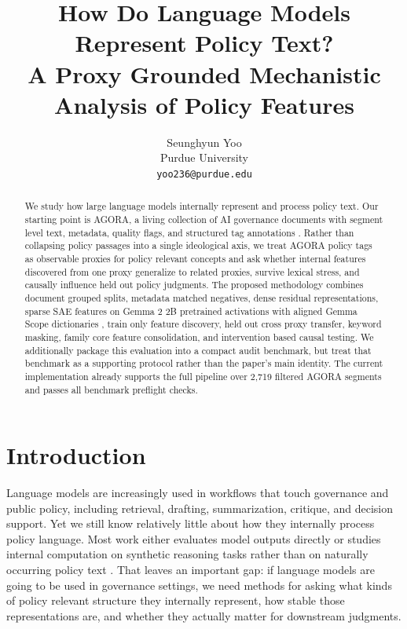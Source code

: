 ﻿\documentclass{article}
\title{How Do Language Models Represent Policy Text?\\
A Proxy Grounded Mechanistic Analysis of Policy Features}
\author{
  Seunghyun Yoo \\
  Purdue University \\
  \texttt{yoo236@purdue.edu}
}
\begin{document}
\maketitle

\begin{abstract}
We study how large language models internally represent and process policy text. Our starting point is AGORA, a living collection of AI governance documents with segment level text, metadata, quality flags, and structured tag annotations \citep{agora2024}. Rather than collapsing policy passages into a single ideological axis, we treat AGORA policy tags as observable proxies for policy relevant concepts and ask whether internal features discovered from one proxy generalize to related proxies, survive lexical stress, and causally influence held out policy judgments. The proposed methodology combines document grouped splits, metadata matched negatives, dense residual representations, sparse SAE features on Gemma 2 2B pretrained activations with aligned Gemma Scope dictionaries \citep{gemma2_2024, lieberum2024gemma}, train only feature discovery, held out cross proxy transfer, keyword masking, family core feature consolidation, and intervention based causal testing. We additionally package this evaluation into a compact audit benchmark, but treat that benchmark as a supporting protocol rather than the paper's main identity. The current implementation already supports the full pipeline over 2,719 filtered AGORA segments and passes all benchmark preflight checks.
\end{abstract}

\section{Introduction}
Language models are increasingly used in workflows that touch governance and public policy, including retrieval, drafting, summarization, critique, and decision support. Yet we still know relatively little about how they internally process policy language. Most work either evaluates model outputs directly or studies internal computation on synthetic reasoning tasks rather than on naturally occurring policy text \citep{elhage2021framework, conmy2023towards, ameisen2025circuit}. That leaves an important gap: if language models are going to be used in governance settings, we need methods for asking what kinds of policy relevant structure they internally represent, how stable those representations are, and whether they actually matter for downstream judgments.
\end{document}
